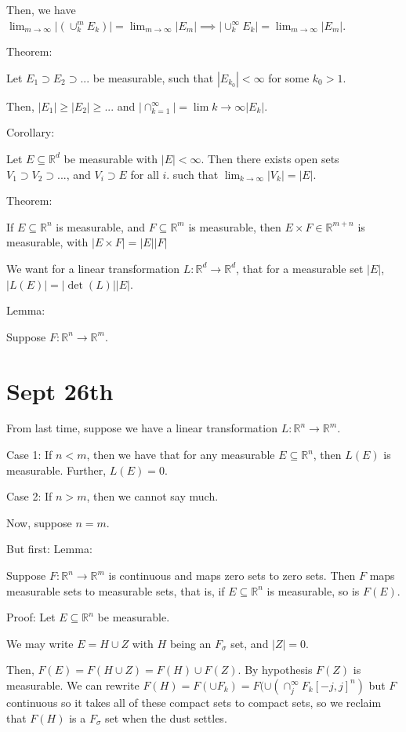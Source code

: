 \documentclass[10pt]{article}
\begin{document}
Then, we have $\lim_{m\to \infty} |(\cup_k^m E_k )| = \lim_{m\to \infty} |E_m| \implies  |\cup_k^\infty E_k | = \lim_{m\to \infty} |E_m|$.

Theorem:

Let $E_1 \supset E_2 \supset ...$ be measurable, such that $|E_{k_0}| < \infty$ for some $k_0 > 1$.

Then, $|E_1| \geq |E_2| \geq ...$ and $|\cap_{k=1}^\infty| = \lim{k \to \infty } |E_k|$.

Corollary:

Let $E \subseteq \mathbb{R}^d$ be measurable with $|E| < \infty$. Then there exists open sets $V_1 \supset V_2 \supset ...$, and $V_i \supset E$ for all $i$. such that $\lim_{k \to \infty}|V_k| = |E|$.

Theorem:

If $E \subseteq \mathbb{R}^n$ is measurable, and $F \subseteq \mathbb{R}^m$ is measurable, then $E \times F \in \mathbb{R}^{m+n}$ is measurable, with $|E \times F| = |E||F|$

We want for a linear transformation $L: \mathbb{R}^d \to \mathbb{R}^d$, that for a measurable set $|E|$, $|L(E)| = |\det(L)| |E|$.

Lemma:
 
Suppose $F: \mathbb{R}^n \to \mathbb{R}^m$. 
 
\section*{Sept 26th}

From last time, suppose we have a linear transformation $L: \mathbb{R}^n \to \mathbb{R}^m$. 

Case 1: If $n < m$, then we have that for any measurable $E \subseteq \mathbb{R}^n$, then $L(E)$ is measurable. Further, $L(E) = 0$.

Case 2: If $n > m$, then we cannot say much.

Now, suppose $n = m$.

But first: Lemma:

Suppose $F: \mathbb{R}^n \to \mathbb{R}^m$ is continuous and maps zero sets to zero sets. Then $F$ maps measurable sets to measurable sets, that is, if $E \subseteq \mathbb{R}^n$ is measurable, so is $F(E)$.

Proof: Let $E \subseteq \mathbb{R}^n$ be measurable.

We may write $E = H \cup Z$ with $H$ being an $F_{\sigma}$ set, and $|Z| = 0$.

Then, $F(E) = F(H \cup Z)  =  F(H) \cup F(Z)$. By hypothesis $F(Z)$ is measurable. We can rewrite $F(H) = F(\cup F_k) = F(\cup (\cap_j^\infty F_k  [-j,j]^n)$ but $F$ continuous so it takes all of these compact sets to compact sets, so we reclaim that $F(H)$ is a $F_\sigma$ set when the dust settles.
\end{document}
